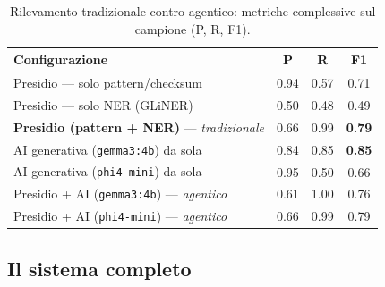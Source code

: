\begin{table}
	\centering
	\caption{Rilevamento tradizionale contro agentico: metriche complessive sul campione (P, R, F1).}
	\label{tab:test-detection-confronto}
	\small
	\begin{tabular}{|l|c|c|c|}
		\hline
		\textbf{Configurazione}                                     & \textbf{P} & \textbf{R} & \textbf{F1}   \\
		\hline
		Presidio --- solo pattern/checksum                          & 0.94       & 0.57       & 0.71          \\
		\hline
		Presidio --- solo NER (GLiNER)                              & 0.50       & 0.48       & 0.49          \\
		\hline
		\textbf{Presidio (pattern + NER)} --- \textit{tradizionale} & 0.66       & 0.99       & \textbf{0.79} \\
		\hline
		AI generativa (\texttt{gemma3:4b}) da sola                  & 0.84       & 0.85       & \textbf{0.85} \\
		\hline
		AI generativa (\texttt{phi4-mini}) da sola                  & 0.95       & 0.50       & 0.66          \\
		\hline
		Presidio + AI (\texttt{gemma3:4b}) --- \textit{agentico}    & 0.61       & 1.00       & 0.76          \\
		\hline
		Presidio + AI (\texttt{phi4-mini}) --- \textit{agentico}    & 0.66       & 0.99       & 0.79          \\
		\hline
	\end{tabular}
\end{table}

\subsection{Il sistema completo}
\label{sub:test-sistema-intero}

